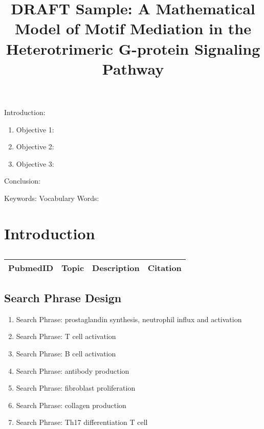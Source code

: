 

\twocolumn
\scriptsize
\begin{frontmatter}
		\title{DRAFT Sample: A Mathematical Model of Motif Mediation in the Heterotrimeric G-protein Signaling Pathway}
		\author{}
		\address{The Mathematical Learning Space}
\end{frontmatter}	

Introduction:
\begin{enumerate}
\item Objective 1:
\item Objective 2:
\item Objective 3:
\end{enumerate}
Conclusion:

Keywords: 
Vocabulary Words:

\section{Introduction}

\centering	
\begin{table}[H]\tiny
	\caption{}	
	\begin{tabular}{rp{1cm}|p{4cm}|l}
		\hline	
		PubmedID & Topic & Description & Citation \\
		\hline 
		\hline 
	\end{tabular}
\end{table}

\subsection{Search Phrase Design}

\begin{enumerate}
	\item Search Phrase: prostaglandin synthesis, neutrophil influx and activation \cite{key1}
	\item Search Phrase: T cell activation \cite{key1}
	\item Search Phrase: B cell activation \cite{key1}
	\item Search Phrase: antibody production \cite{key1}
	\item Search Phrase: fibroblast proliferation \cite{key1}
	\item Search Phrase: collagen production\cite{key1}
	\item Search Phrase: Th17 differentiation T cell \cite{key1}
\end{enumerate}

